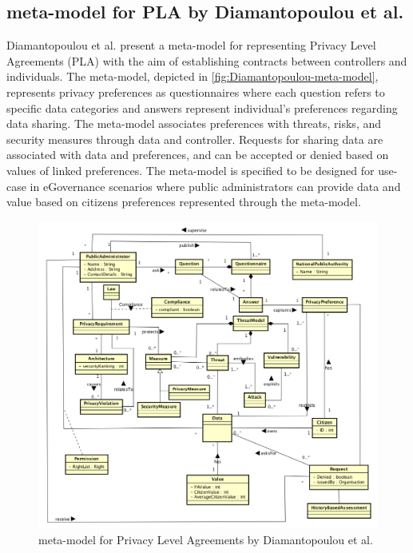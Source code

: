 \subsection*{meta-model for PLA by Diamantopoulou et al.}
Diamantopoulou et al. \cite{diamantopoulou_metamodel_2017} present a meta-model for representing Privacy Level Agreements (PLA) with the aim of establishing contracts between controllers and individuals.
The meta-model, depicted in \autoref{fig:Diamantopoulou-meta-model}, represents privacy preferences as questionnaires where each question refers to specific data categories and answers represent individual's preferences regarding data sharing. The meta-model associates preferences with threats, risks, and security measures through data and controller. Requests for sharing data are associated with data and preferences, and can be accepted or denied based on values of linked preferences.
The meta-model is specified to be designed for use-case in eGovernance scenarios where public administrators can provide data and value based on citizens preferences represented through the meta-model.
\begin{figure}[htbp]
    \centering
    \includegraphics[width=0.8\linewidth]{img/Diamantopoulou_metamodel.png}
    \caption{meta-model for Privacy Level Agreements by Diamantopoulou et al. \cite{diamantopoulou_metamodel_2017}}
    \label{fig:Diamantopoulou-meta-model}
\end{figure}

